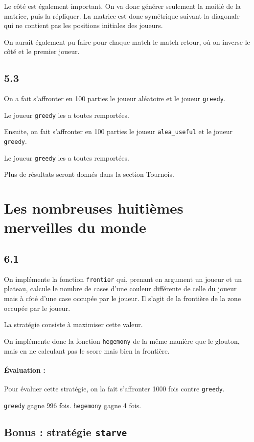 \documentclass[12pt]{article}
\def\question#1{\subsection*{#1}}
\def\sec#1{\section{#1}}
\begin{document}
Le côté est également important. On va donc générer seulement la moitié de la matrice, puis la répliquer. La matrice est donc symétrique suivant la diagonale qui ne contient pas les positions initiales des joueurs.

On aurait également pu faire pour chaque match le match retour, où on inverse le côté et le premier joueur.

\question{5.3}
On a fait s'affronter en 100 parties le joueur aléatoire et le joueur \texttt{greedy}.

Le joueur \texttt{greedy} les a toutes remportées.

Ensuite, on fait s'affronter en 100 parties le joueur \texttt{alea\_useful} et le joueur \texttt{greedy}.

Le joueur \texttt{greedy} les a toutes remportées.

Plus de résultats seront donnés dans la section Tournois.

\sec{Les nombreuses huitièmes merveilles du monde}

\question{6.1}
On implémente la fonction \texttt{frontier} qui, prenant en argument un joueur et un plateau, calcule le nombre de cases d'une couleur différente de celle du joueur mais à côté d'une case occupée par le joueur.
Il s'agit de la frontière de la zone occupée par le joueur.

La stratégie consiste à maximiser cette valeur.

On implémente donc la fonction \texttt{hegemony} de la même manière que le glouton, mais en ne calculant pas le score mais bien la frontière.



\paragraph{Évaluation :}
Pour évaluer cette stratégie, on la fait s'affronter 1000 fois contre \texttt{greedy}.

\texttt{greedy} gagne 996 fois. \texttt{hegemony} gagne 4 fois.

\question{Bonus : stratégie \texttt{starve}}
\end{document}

